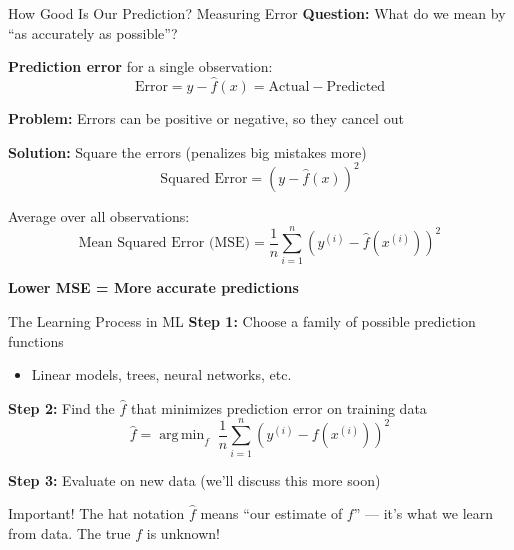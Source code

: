 \documentclass[10pt]{beamer}
\newcommand{\highlight}[1]{\textcolor{AccentOrange}{\textbf{#1}}}
\DeclareMathOperator*{\argmin}{arg\,min}
\begin{document}
\begin{frame}{How Good Is Our Prediction? Measuring Error}
  \textbf{Question:} What do we mean by ``as accurately as possible''?
  
  \vspace{0.5em}
  \textbf{Prediction error} for a single observation:
  \[
  \text{Error} = y - \widehat{f}(x) = \text{Actual} - \text{Predicted}
  \]
  
  \vspace{0.5em}
  \textbf{Problem:} Errors can be positive or negative, so they cancel out
  
  \vspace{0.5em}
  \textbf{Solution:} Square the errors (penalizes big mistakes more)
  \[
  \text{Squared Error} = (y - \widehat{f}(x))^2
  \]
  
  \vspace{0.5em}
  Average over all observations:
  \[
  \text{Mean Squared Error (MSE)} = \frac{1}{n}\sum_{i=1}^{n}(y^{(i)} - \widehat{f}(x^{(i)}))^2
  \]
  
  \vspace{0.3em}
  \highlight{Lower MSE = More accurate predictions}
\end{frame}

\begin{frame}{The Learning Process in ML}
  \textbf{Step 1:} Choose a family of possible prediction functions
  \begin{itemize}
    \item Linear models, trees, neural networks, etc.
  \end{itemize}
  
  \vspace{0.5em}
  \textbf{Step 2:} Find the $\widehat{f}$ that minimizes prediction error on training data
  \[
  \widehat{f} = \argmin_{f} \; \frac{1}{n}\sum_{i=1}^{n}\left(y^{(i)} - f(x^{(i)})\right)^2
  \]
  
  \vspace{0.5em}
  \textbf{Step 3:} Evaluate on new data (we'll discuss this more soon)
  
  \vspace{1em}
  \begin{block}{Important!}
    The hat notation $\widehat{f}$ means ``our estimate of $f$'' --- it's what we learn from data. The true $f$ is unknown!
  \end{block}
\end{frame}

\end{document}

